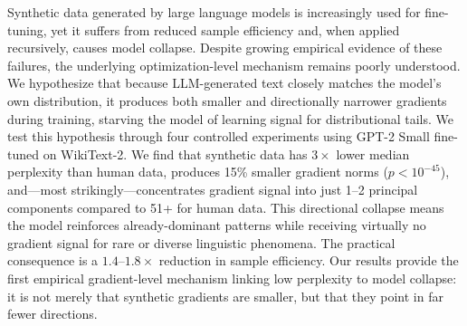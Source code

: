 Synthetic data generated by large language models is increasingly used for fine-tuning, yet it suffers from reduced sample efficiency and, when applied recursively, causes model collapse. Despite growing empirical evidence of these failures, the underlying optimization-level mechanism remains poorly understood. We hypothesize that because LLM-generated text closely matches the model's own distribution, it produces both smaller and directionally narrower gradients during training, starving the model of learning signal for distributional tails. We test this hypothesis through four controlled experiments using GPT-2 Small fine-tuned on WikiText-2. We find that synthetic data has $3\times$ lower median perplexity than human data, produces 15\% smaller gradient norms ($p < 10^{-45}$), and---most strikingly---concentrates gradient signal into just 1--2 principal components compared to 51+ for human data. This directional collapse means the model reinforces already-dominant patterns while receiving virtually no gradient signal for rare or diverse linguistic phenomena. The practical consequence is a $1.4$--$1.8\times$ reduction in sample efficiency. Our results provide the first empirical gradient-level mechanism linking low perplexity to model collapse: it is not merely that synthetic gradients are smaller, but that they point in far fewer directions.
